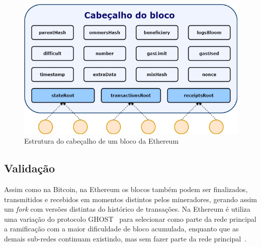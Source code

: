 \begin{figure}[htb]
 \caption{Estrutura do cabeçalho de um bloco da Ethereum}
 \label{fig:eth-block-header}
 \centering
 \includegraphics[scale=0.5]{figuras/eth_block_header.png}
\end{figure}


\subsection{Validação} \label{tex:fund:ethereum:valida}


Assim como na Bitcoin, na Ethereum os blocos também podem ser finalizados, transmitidos e recebidos em momentos distintos pelos mineradores, gerando assim um \textit{fork} com versões distintas do histórico de transações. Na Ethereum é utiliza uma variação do protocolo GHOST~\cite{sompolinsky2015ghost-original} para selecionar como parte da rede principal a ramificação com a maior dificuldade de bloco acumulada, enquanto que as demais sub-redes continuam existindo, mas sem fazer parte da rede principal~\cite{ethereum2014whitepaper}. 

